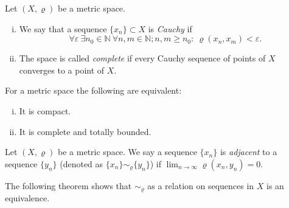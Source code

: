 \begin{define}\label{def:seqprp}
Let $(X,\varrho)$ be a metric space.
\begin{enumerate}[(i)]
	\item We say that a sequence $\{x_n\}\subset X$ is \emph{Cauchy} if
\[
	\forall \varepsilon\ \exists n_0\in \mathbb{N} \ \forall n,m \in \mathbb{N}; n,m\ge n_0:\ \varrho(x_n,x_m)<\varepsilon.
\]
	\item The space is called \emph{complete} if every Cauchy sequence of points of $X$ converges to a point of $X$.
\end{enumerate}
\end{define}

\begin{theorem}\label{th:cmpcmpltb}
For a metric space the following are equivalent:
\begin{enumerate}[(i)]
	\item It is compact.
	\item It is complete and totally bounded.
\end{enumerate}
\end{theorem}

\begin{define}\label{def:adjmp}
	Let $(X,\varrho)$ be a metric space. We say a sequence $\{x_n\} $ is \emph{adjacent} to a sequence $\{y_n\}$ (denoted as $\{x_n\} \sim_\varrho \{y_n\}$) if $\lim_{n\to\infty} \varrho(x_n,y_n)=0$.
\end{define}

The following theorem shows that $\sim_\varrho$ as a relation on sequences in $X$ is an equivalence.

